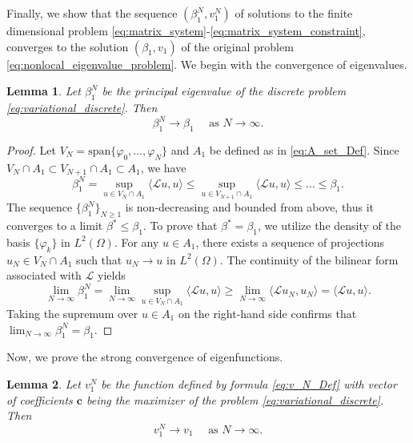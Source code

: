 \documentclass[12pt, a4paper]{article}
\theoremstyle{break}
\theoremstyle{break}
\theoremstyle{break}
\theoremstyle{break}
\theoremstyle{break}
\newtheorem{lem}{Lemma}[section]
\theoremstyle{break}
\theoremstyle{break}
\theoremstyle{break}
\theoremstyle{break}
\begin{document}
Finally, we show that the sequence $(\beta_1^N, v_1^N)$ of solutions to the finite dimensional problem \eqref{eq:matrix_system}-\eqref{eq:matrix_system_constraint}, converges to the solution $(\beta_1, v_1)$ of the original problem \eqref{eq:nonlocal_eigenvalue_problem}. We begin with the convergence of eigenvalues.

\begin{lem}
    \label{lem:convergence_principal_eigenvalue}
    Let $\beta_1^N$ be the principal eigenvalue of the discrete problem \eqref{eq:variational_discrete}. Then
    \begin{equation*}
        \beta_1^N \rightarrow \beta_1 \quad \text{ as } N \rightarrow \infty.
    \end{equation*}
\end{lem}

\begin{proof}
    Let $V_N = \text{span}\{\varphi_0, \ldots, \varphi_N\}$ and $A_1$ be defined as in \eqref{eq:A_set_Def}. Since $V_N \cap A_1 \subset V_{N+1} \cap A_1 \subset A_1$, we have
    \begin{equation}
        \beta_1^N = \sup_{u \in V_N \cap A_1} \langle \mathcal{L} u, u \rangle \leq \sup_{u \in V_{N+1} \cap A_1} \langle \mathcal{L} u, u \rangle \leq \ldots \leq \beta_1.
    \end{equation}
    The sequence $\{\beta_1^N\}_{N \geq 1}$ is non-decreasing and bounded from above, thus it converges to a limit $\beta^* \leq \beta_1$. To prove that $\beta^* = \beta_1$, we utilize the density of the basis $\{\varphi_k\}$ in $L^2(\Omega)$. For any $u \in A_1$, there exists a sequence of projections $u_N \in V_N \cap A_1$ such that $u_N \to u$ in $L^2(\Omega)$. The continuity of the bilinear form associated with $\mathcal{L}$ yields
    \begin{equation}
        \lim_{N \to \infty} \beta_1^N = \lim_{N \to \infty} \sup_{u \in V_N \cap A_1} \langle \mathcal{L} u, u \rangle \geq \lim_{N \to \infty} \langle \mathcal{L} u_N, u_N \rangle = \langle \mathcal{L} u, u \rangle.
    \end{equation}
    Taking the supremum over $u \in A_1$ on the right-hand side confirms that $\lim_{N \to \infty} \beta_1^N = \beta_1$.
\end{proof}

Now, we prove the strong convergence of eigenfunctions.

\begin{lem}
    \label{lem:convergence_principal_eigenfunction}
    Let $v_1^N$ be the function defined by formula \eqref{eq:v_N_Def} with vector of coefficients $\mathbf{c}$ being the maximizer of the problem \eqref{eq:variational_discrete}. Then 
    \begin{equation*}
        v_1^N \rightarrow v_1 \quad \text{ as } N \rightarrow \infty.
    \end{equation*}
\end{lem}
\end{document}
